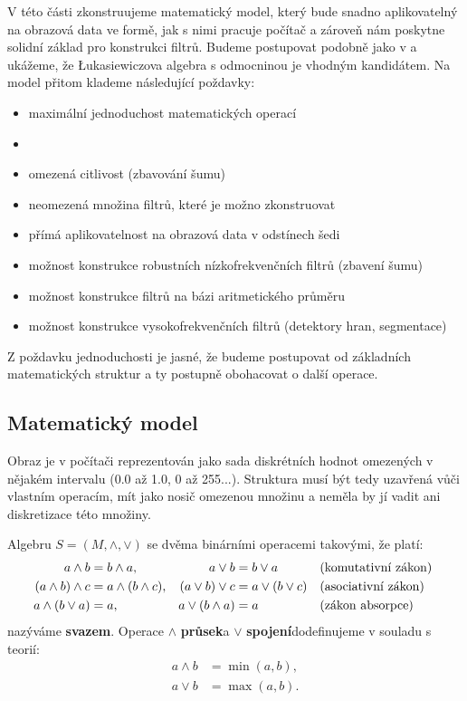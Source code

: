     V této části zkonstruujeme matematický model, který bude snadno aplikovatelný na obrazová data ve formě, jak s nimi pracuje počítač a zároveň nám poskytne solidní základ pro konstrukci filtrů. Budeme postupovat podobně jako v \cite{MajerovaPhD} a ukážeme, že \L ukasiewiczova algebra s odmocninou je vhodným kandidátem. Na model přitom klademe následující poždavky:
    \begin{itemize}
      \item maximální jednoduchost matematických operací
      \item {}
      \item omezená citlivost (zbavování šumu)
      \item neomezená množina filtrů, které je možno zkonstruovat
      \item přímá aplikovatelnost na obrazová data v odstínech šedi
      \item možnost konstrukce robustních nízkofrekvenčních filtrů (zbavení šumu)
      \item možnost konstrukce filtrů na bázi aritmetického průměru
      \item možnost konstrukce vysokofrekvenčních filtrů (detektory hran, segmentace)
    \end{itemize}
    Z poždavku jednoduchosti je jasné, že budeme postupovat od základních matematických struktur a ty postupně obohacovat o další operace.

    \subsection{Matematický model}

    Obraz je v počítači reprezentován jako sada diskrétních hodnot omezených v nějakém intervalu (0.0 až 1.0, 0 až 255...). Struktura musí být tedy uzavřená vůči vlastním operacím, mít jako nosič omezenou množinu a neměla by jí vadit ani diskretizace této množiny.

    \begin{define}\label{svaz}
    Algebru $S = (M,\wedge,\vee)$ se dvěma binárními operacemi takovými, že platí:
    \begin{align}
    a \wedge b &= b \wedge a, & a \vee b &= b \vee a &&\text{\textup{(}komutativní zákon\textup{)\,\,}} \\
    (a \wedge b) \wedge c &= a \wedge (b \wedge c), & (a \vee b) \vee c &= a \vee (b \vee c) &&\text{\textup{(}asociativní zákon\textup{)\,\,}} \\
    a \wedge (b \vee a) &= a,& a \vee (b \wedge a) &= a &&\text{\textup{(}zákon absorpce\textup{)\,\,}}
    \end{align}
    nazýváme \textbf{svazem}. Operace $\wedge$ \rl\textbf{průsek}\rr a $\vee$ \rl\textbf{spojení}\rr dodefinujeme v souladu s teorií:
    \begin{align}
    a \wedge b &= \min(a,b), \\
    a \vee b &= \max(a,b).
    \end{align}
    \end{define}

